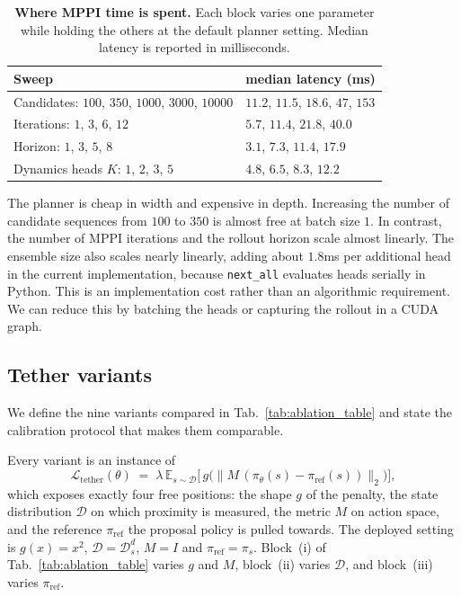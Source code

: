 \documentclass{article} %
\begin{document}
\begin{table}[h]
\centering
\caption{%
  \textbf{Where MPPI time is spent.} Each block
  varies one parameter while holding the others at the default planner setting. Median latency is reported in milliseconds.}
\label{tab:app-mppi-breakdown}
\small
\begin{tabular}{ll}
\toprule
Sweep & median latency (ms) \\
\midrule
Candidates: $100$, $350$, $1000$, $3000$, $10000$
  & $11.2$, $11.5$, $18.6$, $47$, $153$ \\
Iterations: $1$, $3$, $6$, $12$
  & $5.7$, $11.4$, $21.8$, $40.0$ \\
Horizon: $1$, $3$, $5$, $8$
  & $3.1$, $7.3$, $11.4$, $17.9$ \\
Dynamics heads $K$: $1$, $2$, $3$, $5$
  & $4.8$, $6.5$, $8.3$, $12.2$ \\
\bottomrule
\end{tabular}
\end{table}

The planner is cheap in width and expensive in depth. Increasing the number of candidate sequences from $100$ to $350$ is almost free at batch size $1$. In contrast, the number of MPPI iterations and the rollout horizon scale almost linearly. The ensemble size also scales nearly linearly, adding about $1.8$ms per additional head in the current implementation, because \texttt{next\_all} evaluates heads
serially in Python. This is an implementation cost rather than an algorithmic requirement. We can reduce this by batching the heads or capturing the rollout in a CUDA graph.

\subsection{Tether variants}
\label{app:tether}

We define the nine variants compared in Tab.~\ref{tab:ablation_table} and state the calibration protocol that makes them comparable.

Every variant is an instance of
\begin{equation}
\mathcal{L}_{\mathrm{tether}}(\theta) \;=\; \lambda\,
\mathbb{E}_{s\sim\mathcal{D}}\Big[\,
g\big(\lVert M\,(\pi_\theta(s)-\pi_{\mathrm{ref}}(s))\rVert_2\big)\Big],
\label{eq:tether-general}
\end{equation}
which exposes exactly four free positions: the shape $g$ of the penalty, the state distribution $\mathcal{D}$ on which proximity is measured, the metric $M$ on action space, and the reference $\pi_{\mathrm{ref}}$ the proposal policy is pulled towards. The deployed setting is $g(x)=x^2$, $\mathcal{D}=\mathcal{D}^d_s$, $M=I$ and $\pi_{\mathrm{ref}}=\pi_s$. Block~(i) of Tab.~\ref{tab:ablation_table} varies $g$ and $M$, block~(ii) varies $\mathcal{D}$, and block~(iii) varies $\pi_{\mathrm{ref}}$.
\end{document}
